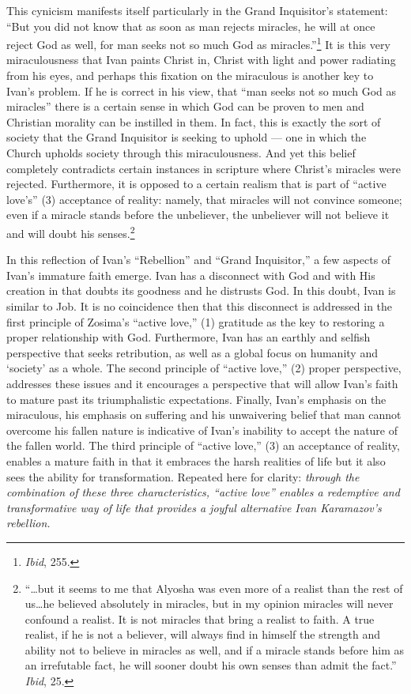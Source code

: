 This cynicism manifests itself particularly in the Grand Inquisitor's statement: ``But you did not know that as soon as man rejects miracles, he will at once reject God as well, for man seeks not so much God as miracles.''\footnote{\emph{Ibid}, 255.} It is this very miraculousness that Ivan paints Christ in, Christ with light and power radiating from his eyes, and perhaps this fixation on the miraculous is another key to Ivan's problem. If he is correct in his view, that ``man seeks not so much God as miracles'' there is a certain sense in which God can be proven to men and Christian morality can be instilled in them. In fact, this is exactly the sort of society that the Grand Inquisitor is seeking to uphold --- one in which the Church upholds society through this miraculousness. And yet this belief completely contradicts certain instances in scripture where Christ's miracles were rejected. Furthermore, it is opposed to a certain realism that is part of ``active love's'' (3) acceptance of reality: namely, that miracles will not convince someone; even if a miracle stands before the unbeliever, the unbeliever will not believe it and will doubt his senses.\footnote{``\ldots but it seems to me that Alyosha was even more of a realist than the rest of us\ldots he believed absolutely in miracles, but in my opinion miracles will never confound a realist. It is not miracles that bring a realist to faith. A true realist, if he is not a believer, will always find in himself the strength and ability not to believe in miracles as well, and if a miracle stands before him as an irrefutable fact, he will sooner doubt his own senses than admit the fact.'' \emph{Ibid}, 25.} 

In this reflection of Ivan's ``Rebellion'' and ``Grand Inquisitor,'' a few aspects of Ivan's immature faith emerge. Ivan has a disconnect with God and with His creation in that  doubts its goodness and he distrusts God. In this doubt, Ivan is similar to Job. It is no coincidence then that this disconnect is addressed in the first principle of Zosima's ``active love,'' (1) gratitude as the key to restoring a proper relationship with God. Furthermore, Ivan has an earthly and selfish perspective that seeks retribution, as well as a global focus on humanity and `society' as a whole. The second principle of ``active love,'' (2) proper perspective, addresses these issues and it encourages a perspective that will allow Ivan's faith to mature past its triumphalistic expectations. Finally, Ivan's emphasis on the miraculous, his emphasis on suffering and his unwaivering belief that man cannot overcome his fallen nature is indicative of Ivan's inability to accept the nature of the fallen world. The third principle of ``active love,'' (3) an acceptance of reality, enables a mature faith in that it embraces the harsh realities of life but it also sees the ability for transformation. Repeated here for clarity: \emph{through the combination of these three characteristics, ``active love'' enables a redemptive and transformative way of life that provides a joyful alternative Ivan Karamazov's rebellion.}

